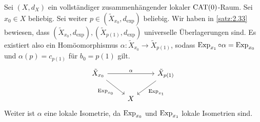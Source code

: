 \begin{bemerkung}
\label{bem:2.37}
	Sei $(X,d_X)$ ein vollständiger zusammenhängender lokaler $\operatorname{CAT(0)}$-Raum.
	Sei $x_0 \in X$ beliebig.
	Sei weiter $p \in (\tilde{X}_{x_0},d_{\exp})$ beliebig.
	Wir haben in \autoref{satz:2.33} bewiesen, dass $(\tilde{X}_{x_0},d_{\exp}), (\tilde{X}_{p(1)},d_{\exp})$ universelle Überlagerungen sind.
	Es existiert also ein Homöomorphismus $\alpha \colon \tilde{X}_{x_0} \rightarrow \tilde{X}_{p(1)}$, sodass $\operatorname{Exp}_{x_1} \circ \alpha = \operatorname{Exp}_{x_0}$ und $\alpha(p) = c_{p(1)}$ für $b_0 = p(1)$ gilt.
	\[
		\begin{tikzcd}
			\tilde{X}_{x_0} \arrow{rr}{\alpha} \arrow{rd}[swap]{\Exp_{x_0}} & & \tilde{X}_{p(1)} \arrow{ld}{\Exp_{x_1}} \\
			& X & 
		\end{tikzcd}
	\]	
	Weiter ist $\alpha$ eine lokale Isometrie, da $\operatorname{Exp}_{x_0}$ und $\operatorname{Exp}_{x_1}$ lokale Isometrien sind.
\end{bemerkung}

